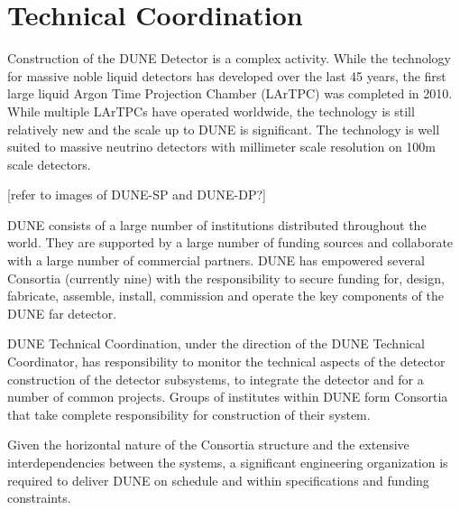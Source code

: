\chapter{Technical Coordination}
\label{ch:fdsp-coord}

Construction of the DUNE Detector is a complex activity. While the
technology for massive noble liquid detectors has developed over the
last 45 years, the first large liquid Argon Time Projection Chamber
(LArTPC) was completed in 2010. While multiple LArTPCs have operated
worldwide, the technology is still relatively new and the scale up to
DUNE is significant. The technology is well suited to massive neutrino
detectors with millimeter scale resolution on 100m scale detectors.

[refer to images of DUNE-SP and DUNE-DP?]

DUNE consists of a large number of institutions distributed throughout
the world. They are supported by a large number of funding sources and
collaborate with a large number of commercial partners. DUNE has
empowered several Consortia (currently nine) with the responsibility
to secure funding for, design, fabricate, assemble, install,
commission and operate the key components of the DUNE far detector.

DUNE Technical Coordination, under the direction of the DUNE Technical
Coordinator, has responsibility to monitor the technical aspects of
the detector construction of the detector subsystems, to integrate the
detector and for a number of common projects. Groups of institutes
within DUNE form Consortia that take complete responsibility for
construction of their system.

Given the horizontal nature of the Consortia structure and the
extensive interdependencies between the systems, a significant
engineering organization is required to deliver DUNE on schedule and
within specifications and funding constraints.


